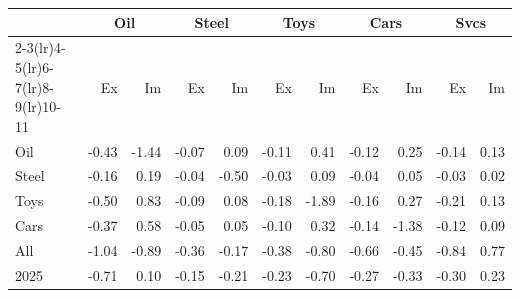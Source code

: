 \begin{tabular}{lrrrrrrrrrr}
\toprule
 & \multicolumn{2}{c}{Oil} & \multicolumn{2}{c}{Steel} & \multicolumn{2}{c}{Toys} & \multicolumn{2}{c}{Cars} & \multicolumn{2}{c}{Svcs} \\
\cmidrule(lr){2-3}\cmidrule(lr){4-5}\cmidrule(lr){6-7}\cmidrule(lr){8-9}\cmidrule(lr){10-11}
 & Ex & Im & Ex & Im & Ex & Im & Ex & Im & Ex & Im \\
\midrule
Oil & -0.43 & -1.44 & -0.07 & 0.09 & -0.11 & 0.41 & -0.12 & 0.25 & -0.14 & 0.13 \\
Steel & -0.16 & 0.19 & -0.04 & -0.50 & -0.03 & 0.09 & -0.04 & 0.05 & -0.03 & 0.02 \\
Toys & -0.50 & 0.83 & -0.09 & 0.08 & -0.18 & -1.89 & -0.16 & 0.27 & -0.21 & 0.13 \\
Cars & -0.37 & 0.58 & -0.05 & 0.05 & -0.10 & 0.32 & -0.14 & -1.38 & -0.12 & 0.09 \\
All & -1.04 & -0.89 & -0.36 & -0.17 & -0.38 & -0.80 & -0.66 & -0.45 & -0.84 & 0.77 \\
2025 & -0.71 & 0.10 & -0.15 & -0.21 & -0.23 & -0.70 & -0.27 & -0.33 & -0.30 & 0.23 \\
\bottomrule
\end{tabular}
